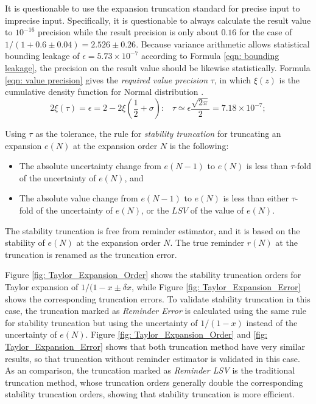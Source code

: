 \documentclass[twoside]{article}
\numberwithin{equation}{section}
\newcommand{\eqspace}{\;\;\;}
\begin{document}
It is questionable to use the expansion truncation standard for precise input to imprecise input.
Specifically, it is questionable to always calculate the result value to $10^{-16}$ precision while the result precision is only about $0.16$ for the case of $1/(1 + 0.6 \pm 0.04)=2.526 \pm 0.26$.
Because variance arithmetic allows statistical bounding leakage of $\epsilon = 5.73 \times 10^{-7}$ according to Formula \eqref{eqn: bounding leakage}, the precision on the result value should be likewise statistically.
Formula \eqref{eqn: value precision} gives the \emph{required value precision} $\tau$, in which $\xi(z)$ is the cumulative density function for Normal distribution \cite{Probability_Statistics}.
\begin{equation}
\label{eqn: value precision}
2 \xi(\tau) = \epsilon = 2 - 2 \xi(\frac{1}{2} + \sigma):\eqspace \tau \simeq \epsilon \frac{\sqrt{2 \pi}}{2} = 7.18\times 10^{-7};
\end{equation}

Using $\tau$ as the tolerance, the rule for \emph{stability truncation} for truncating an expansion $e(N)$ at the expansion order $N$ is the following:
\begin{itemize}
\item The absolute uncertainty change from $e(N-1)$ to $e(N)$ is less than $\tau$-fold of the uncertainty of $e(N)$, and

\item The absolute value change from $e(N-1)$ to $e(N)$ is less than either $\tau$-fold of the uncertainty of $e(N)$, or the $LSV$ of the value of $e(N)$.

\end{itemize}
The stability truncation is free from reminder estimator, and it is based on the stability of $e(N)$ at the expansion order $N$.
The true reminder $r(N)$ at the truncation is renamed as the truncation error.

Figure \ref{fig: Taylor_Expansion_Order} shows the stability truncation orders for Taylor expansion of $1/(1 - x \pm \delta x$, while Figure \ref{fig: Taylor_Expansion_Error} shows the corresponding truncation errors.
To validate stability truncation in this case, the truncation marked as \textit{Reminder Error} is calculated using the same rule for stability truncation but using the uncertainty of $1/(1-x)$ instead of the uncertainty of $e(N)$. 
Figure \ref{fig: Taylor_Expansion_Order} and \ref{fig: Taylor_Expansion_Error} shows that both truncation method have very similar results, so that truncation without reminder estimator is validated in this case.
As an comparison, the truncation marked as \textit{Reminder LSV} is the traditional truncation method, whose truncation orders generally double the corresponding stability truncation orders, showing that stability truncation is more efficient.
\end{document}
